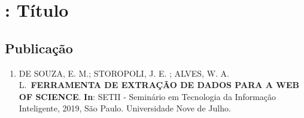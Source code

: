 \section{: Título}
    \subsection*{Publicação}
        \begin{enumerate}
            \item DE SOUZA, E. M.; STOROPOLI, J. E. ; ALVES, W. A. L.~\textbf{FERRAMENTA DE EXTRAÇÃO DE DADOS PARA A WEB OF SCIENCE}. \textbf{In}: SETII - Seminário em Tecnologia da Informação Inteligente, 2019, São Paulo. Universidade Nove de Julho.
        \end{enumerate}